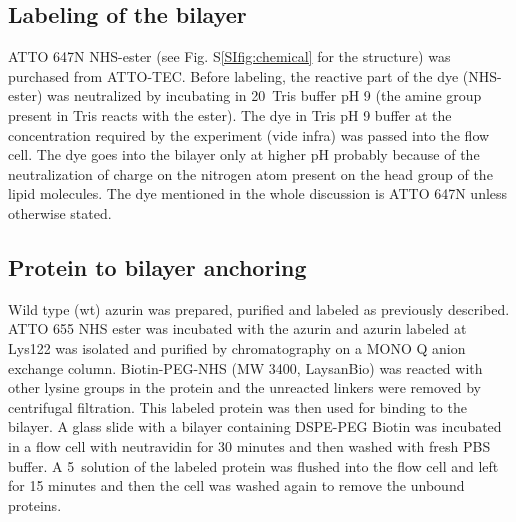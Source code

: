 \subsection{Labeling of the bilayer}
ATTO 647N NHS-ester (see Fig. S\ref{SIfig:chemical} for the structure) was purchased from ATTO-TEC. Before labeling, the reactive part of the dye (NHS-ester) was neutralized by incubating in 20~\mM Tris buffer pH 9 (the amine group present in Tris reacts with the ester). The dye in Tris pH 9 buffer at the concentration required by the experiment (vide infra) was passed into the flow cell. The dye goes into the bilayer only at higher pH probably because of the neutralization of charge on the nitrogen atom present on the head group of the lipid molecules. The dye mentioned in the whole discussion is ATTO 647N unless otherwise stated.
\subsection{Protein to bilayer anchoring}
Wild type (wt) azurin was prepared, purified and labeled as previously described.\cite{VANDEKAMP1990283,nicolardi2012top-down} ATTO 655 NHS ester was incubated with the azurin and azurin labeled at Lys122 was isolated and purified by chromatography on a MONO Q anion exchange column. Biotin-PEG-NHS (MW 3400, LaysanBio) was reacted with other lysine groups in the protein and the unreacted linkers were removed by centrifugal filtration. This labeled protein was then used for binding to the bilayer. A glass slide with a bilayer containing DSPE-PEG Biotin was incubated in a flow cell with neutravidin for 30 minutes and then washed with fresh PBS buffer. A 5~\nM solution of the labeled protein was flushed into the flow cell and left for 15 minutes and then the cell was washed again to remove the unbound proteins.
